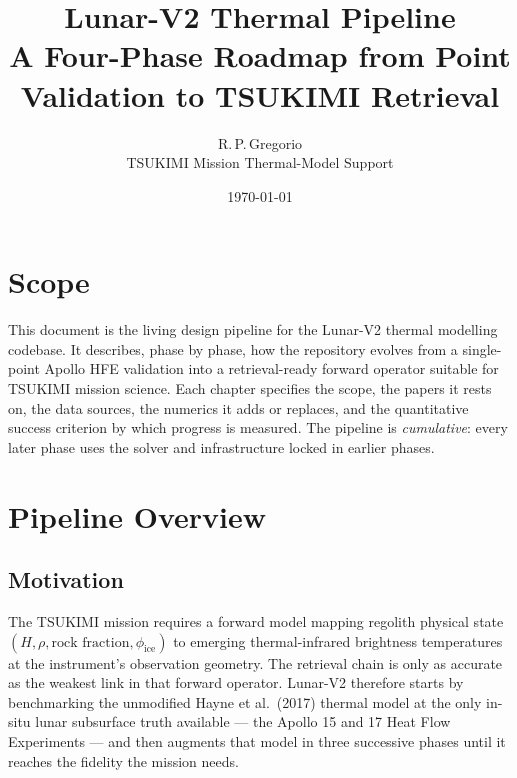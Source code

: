 \documentclass[11pt,a4paper]{book}
\title{\textbf{Lunar-V2 Thermal Pipeline}\\[0.4em]\Large A Four-Phase Roadmap from Point Validation to TSUKIMI Retrieval}
\author{R.\,P.\,Gregorio\\[0.3em]\small TSUKIMI Mission Thermal-Model Support}
\date{\today}
\begin{document}
\frontmatter
\maketitle

\chapter*{Scope}
This document is the living design pipeline for the Lunar-V2 thermal
modelling codebase. It describes, phase by phase, how the repository
evolves from a single-point Apollo HFE validation into a retrieval-ready
forward operator suitable for TSUKIMI mission science. Each chapter
specifies the scope, the papers it rests on, the data sources, the
numerics it adds or replaces, and the quantitative success criterion by
which progress is measured. The pipeline is \emph{cumulative}: every
later phase uses the solver and infrastructure locked in earlier
phases.

\tableofcontents

\mainmatter

\chapter{Pipeline Overview}
\section{Motivation}
The TSUKIMI mission requires a forward model mapping regolith
physical state $(H,\rho,\text{rock fraction},\phi_\text{ice})$ to
emerging thermal-infrared brightness temperatures at the instrument's
observation geometry. The retrieval chain is only as accurate as the
weakest link in that forward operator. Lunar-V2 therefore starts by
benchmarking the unmodified Hayne et al.\ (2017) thermal model at the
only in-situ lunar subsurface truth available --- the Apollo 15 and 17
Heat Flow Experiments --- and then augments that model in three
successive phases until it reaches the fidelity the mission needs.
\end{document}
